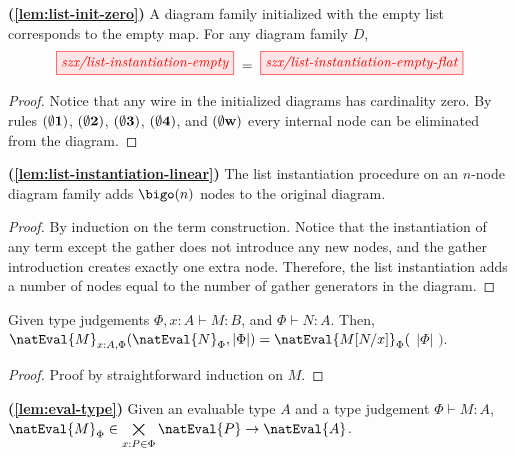 \begin{lemma}{\!\textbf{(\ref{lem:list-init-zero})}}
    A diagram family initialized with the empty list corresponds to the empty map.
    For any diagram family $D$,
    \[
        \tikzfig{szx/list-instantiation-empty}
        \;=\;
        \tikzfig{szx/list-instantiation-empty-flat}
    \]
\end{lemma}

\begin{proof}
    Notice that any wire in the initialized diagrams has cardinality zero.
    By rules ${(\bf\emptyset 1)}$, ${(\bf\emptyset 2)}$, ${(\bf\emptyset 3)}$,
    ${(\bf\emptyset 4)}$, and ${(\bf \emptyset w)}$
    every internal node can be eliminated from the diagram.
\end{proof}

\begin{lemma}{\!\textbf{(\ref{lem:list-instantiation-linear})}}
    The list instantiation procedure on an $n$-node diagram family adds
    $\bigo(n)$ nodes to the original diagram.
\end{lemma}

\begin{proof}
    By induction on the term construction.
    Notice that the instantiation of any term except the gather
    does not introduce any new nodes, and the gather introduction
    creates exactly one extra node.
    Therefore, the list instantiation adds a number of nodes equal to
    the number of gather generators in the diagram.
\end{proof}

\begin{lemma}%
    \label{lem:eval-substitution}
    Given type judgements $\Phi, x:A \vdash M : B$, and $\Phi\vdash N : A$. Then, $\natEval{M}_{x:A,\Phi} (\natEval{N}_{\Phi},|\Phi|)= \natEval{M[N/x]}_\Phi($ $|\Phi|$ $)$.
\end{lemma}

\begin{proof}
Proof by straightforward induction on $M$.
\end{proof}

\begin{lemma}{\!\textbf{(\ref{lem:eval-type})}}
    Given an evaluable type $A$ and a type judgement $\Phi \vdash M : A$,
    $\natEval{M}_\Phi \in \bigtimes\limits_{x:P \in \Phi} \natEval{P} \to \natEval{A}$.
\end{lemma}

